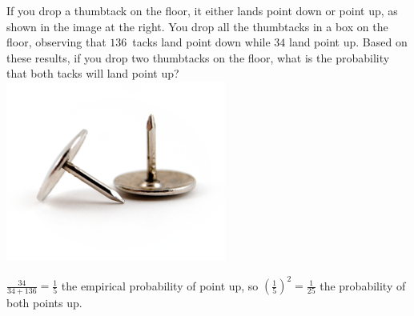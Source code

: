 \documentclass[answers,addpoints,12pt]{exam}
\begin{document}
\begin{questions}
\begin{solution}
\end{solution}

\question[10]
\begin{multicols}{2}
If you drop a thumbtack on the floor, it either lands point down
or point up, as shown in the image at the right.
You drop all the thumbtacks in a box on the floor, observing that
$136$~tacks land point down while $34$ land point up.
Based on these results, if you drop two thumbtacks on the floor, what
is the probability that both tacks will land point up?
\columnbreak\\
\includegraphics[scale=.6]{Thumbtacks}
\end{multicols}
\begin{solution}
$\frac{34}{34+136}=\frac{1}{5}$ the empirical probability
of point up, so $\left(\frac{1}{5}\right)^2=\frac{1}{25}$
the probability of both points up.
\end{solution}


\end{questions}
\end{document}
